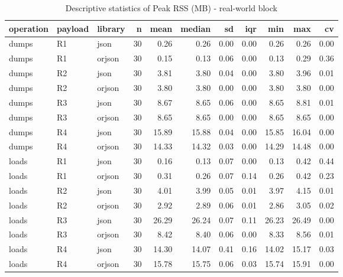 \begin{table}[ht]
\centering
\begin{tabular}{lllrrrrrrrr}
  \toprule
operation & payload & library & n & mean & median & sd & iqr & min & max & cv \\ 
  \midrule
dumps & R1 & json &  30 & 0.26 & 0.26 & 0.00 & 0.00 & 0.26 & 0.26 & 0.00 \\ 
  dumps & R1 & orjson &  30 & 0.15 & 0.13 & 0.06 & 0.00 & 0.13 & 0.29 & 0.36 \\ 
  dumps & R2 & json &  30 & 3.81 & 3.80 & 0.04 & 0.00 & 3.80 & 3.96 & 0.01 \\ 
  dumps & R2 & orjson &  30 & 3.80 & 3.80 & 0.00 & 0.00 & 3.80 & 3.80 & 0.00 \\ 
  dumps & R3 & json &  30 & 8.67 & 8.65 & 0.06 & 0.00 & 8.65 & 8.81 & 0.01 \\ 
  dumps & R3 & orjson &  30 & 8.65 & 8.65 & 0.00 & 0.00 & 8.65 & 8.65 & 0.00 \\ 
  dumps & R4 & json &  30 & 15.89 & 15.88 & 0.04 & 0.00 & 15.85 & 16.04 & 0.00 \\ 
  dumps & R4 & orjson &  30 & 14.33 & 14.32 & 0.03 & 0.00 & 14.29 & 14.48 & 0.00 \\ 
  loads & R1 & json &  30 & 0.16 & 0.13 & 0.07 & 0.00 & 0.13 & 0.42 & 0.44 \\ 
  loads & R1 & orjson &  30 & 0.31 & 0.26 & 0.07 & 0.14 & 0.26 & 0.42 & 0.23 \\ 
  loads & R2 & json &  30 & 4.01 & 3.99 & 0.05 & 0.01 & 3.97 & 4.15 & 0.01 \\ 
  loads & R2 & orjson &  30 & 2.92 & 2.89 & 0.06 & 0.01 & 2.86 & 3.05 & 0.02 \\ 
  loads & R3 & json &  30 & 26.29 & 26.24 & 0.07 & 0.11 & 26.23 & 26.49 & 0.00 \\ 
  loads & R3 & orjson &  30 & 8.42 & 8.40 & 0.06 & 0.00 & 8.33 & 8.56 & 0.01 \\ 
  loads & R4 & json &  30 & 14.30 & 14.07 & 0.41 & 0.16 & 14.02 & 15.17 & 0.03 \\ 
  loads & R4 & orjson &  30 & 15.78 & 15.75 & 0.06 & 0.03 & 15.74 & 15.91 & 0.00 \\ 
   \bottomrule
\end{tabular}
\caption{Descriptive statistics of Peak RSS (MB) - real-world block} 
\label{tab:rw_desc_RAM}
\end{table}
